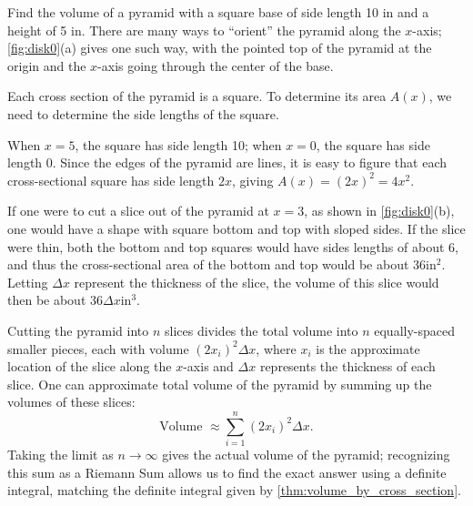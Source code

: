 \begin{example}\label{ex_disk0}
Find the volume of a pyramid with a square base of side length 10 in and a height of 5 in.
\solution
There are many ways to ``orient'' the pyramid along the $x$-axis; \autoref{fig:disk0}(a) gives one such way, with the pointed top of the pyramid at the origin and the $x$-axis going through the center of the base.

Each cross section of the pyramid is a square.
To determine its area $A(x)$, we need to determine the side lengths of the square.

When $x=5$, the square has side length 10; when $x=0$, the square has side length 0. Since the edges of the pyramid are lines, it is easy to figure that each cross-sectional square has side length $2x$, giving $A(x) = (2x)^2=4x^2$.

If one were to cut a slice out of the pyramid at $x=3$, as shown in \autoref{fig:disk0}(b), one would have a shape with square bottom and top with sloped sides. If the slice were thin, both the bottom and top squares would have sides lengths of about 6, and thus the cross-sectional area of the bottom and top would be about 36in$^2$. Letting $\Delta x$ represent the thickness of the slice, the volume of this slice would then be about $36\Delta x$in$^3$. 

Cutting the pyramid into $n$ slices divides the total volume into $n$ equally-spaced smaller pieces, each with volume $(2x_i)^2\Delta x$, where $x_i$ is the approximate location of the slice along the $x$-axis and $\Delta x$ represents the thickness of each slice. One can approximate total volume of the pyramid by summing up the volumes of these slices:
\[\text{Volume } \approx \sum_{i=1}^n (2x_i)^2\Delta x.\]
Taking the limit as $n\to\infty$ gives the actual volume of the pyramid; recognizing this sum as a Riemann Sum allows us to find the exact answer using a definite integral, matching the definite integral given by \autoref{thm:volume_by_cross_section}.


\end{example}
